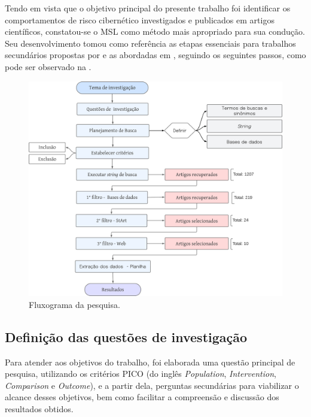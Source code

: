 \documentclass[portuguese]{textolivre}
\begin{document}
Tendo em vista que o objetivo principal do presente trabalho foi identificar os comportamentos de risco cibernético investigados e publicados em artigos científicos, constatou-se o MSL como método mais apropriado para sua condução. Seu desenvolvimento tomou como referência as etapas essenciais para trabalhos secundários propostas por \textcite{kitchenham_guidelines_2007} e as abordadas em \textcite{cabrejos_planejamento_2018}, seguindo os seguintes passos, como pode ser observado na .

\begin{figure}[htbp]
\centering
\begin{minipage}{0.85\linewidth}
  \includegraphics[width=\linewidth]{Fig1.png}
  \caption{Fluxograma da pesquisa.}
  \label{fig1}
\end{minipage}
\end{figure}

\subsection{Definição das questões de investigação}\label{sec-fmt-manuscrito}
Para atender aos objetivos do trabalho, foi elaborada uma questão principal de pesquisa, utilizando os critérios PICO (do inglês \textit{Population}, \textit{Intervention}, \textit{Comparison} e \textit{Outcome}), e a partir dela, perguntas secundárias para viabilizar o alcance desses objetivos, bem como facilitar a compreensão e discussão dos resultados obtidos.
\end{document}
